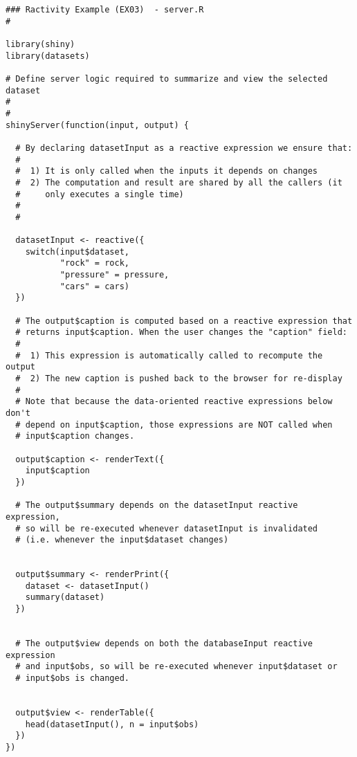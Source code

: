 \documentclass[a4paper,12pt]{article}
\begin{document}
\begin{framed}
\begin{verbatim}
### Ractivity Example (EX03)  - server.R
#

library(shiny)
library(datasets)

# Define server logic required to summarize and view the selected dataset
#
#
shinyServer(function(input, output) {

  # By declaring datasetInput as a reactive expression we ensure that:
  #
  #  1) It is only called when the inputs it depends on changes
  #  2) The computation and result are shared by all the callers (it 
  #     only executes a single time)
  #
  #
  
  datasetInput <- reactive({
    switch(input$dataset,
           "rock" = rock,
           "pressure" = pressure,
           "cars" = cars)
  })

  # The output$caption is computed based on a reactive expression that
  # returns input$caption. When the user changes the "caption" field:
  #
  #  1) This expression is automatically called to recompute the output 
  #  2) The new caption is pushed back to the browser for re-display
  # 
  # Note that because the data-oriented reactive expressions below don't 
  # depend on input$caption, those expressions are NOT called when 
  # input$caption changes.
  
  output$caption <- renderText({
    input$caption
  })

  # The output$summary depends on the datasetInput reactive expression, 
  # so will be re-executed whenever datasetInput is invalidated
  # (i.e. whenever the input$dataset changes)
  
  
  output$summary <- renderPrint({
    dataset <- datasetInput()
    summary(dataset)
  })


  # The output$view depends on both the databaseInput reactive expression
  # and input$obs, so will be re-executed whenever input$dataset or 
  # input$obs is changed. 
  
  
  output$view <- renderTable({
    head(datasetInput(), n = input$obs)
  })
})
\end{verbatim}
\end{framed}
\newpage
\end{document}
